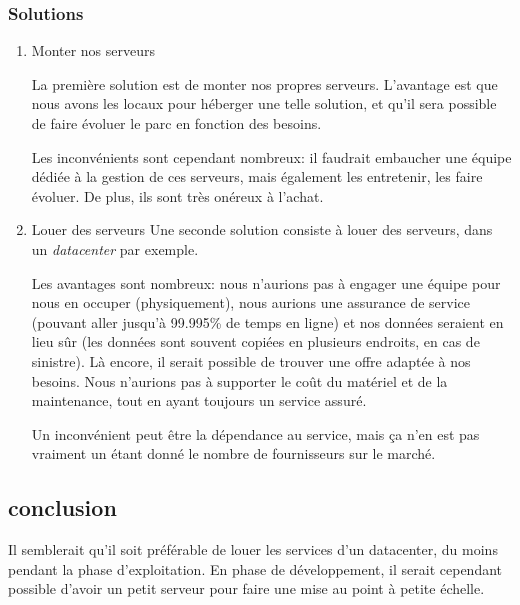     \subsubsection{Solutions}
        \begin{enumerate}
            \item Monter nos serveurs
            
            La première solution est de monter nos propres serveurs.
            L'avantage est que nous avons les locaux pour héberger une telle solution, et qu'il sera possible de faire évoluer le parc en fonction des besoins.
    
            Les inconvénients sont cependant nombreux: il faudrait embaucher une équipe dédiée à la gestion de ces serveurs, mais également les entretenir,
            les faire évoluer. De plus, ils sont très onéreux à l'achat.

            \item Louer des serveurs
            Une seconde solution consiste à louer des serveurs, dans un \textsl{datacenter} par exemple.

            Les avantages sont nombreux: nous n'aurions pas à engager une équipe pour
            nous en occuper (physiquement), nous aurions une assurance de service
            (pouvant aller jusqu'à 99.995\% de temps en ligne) et nos données seraient
            en lieu sûr (les données sont souvent copiées en plusieurs endroits, en cas de sinistre). Là encore, il serait possible de trouver une offre adaptée à nos besoins. Nous n'aurions pas à supporter le coût du matériel et de la maintenance, tout en ayant toujours un service assuré.

            Un inconvénient peut être la dépendance au service, mais ça n'en est pas vraiment un étant donné le nombre de fournisseurs sur le marché.
        \end{enumerate}
    \subsection{conclusion}
    Il semblerait qu'il soit préférable de louer les services d'un datacenter, du moins pendant la phase d'exploitation. En phase de développement,
il serait cependant possible d'avoir un petit serveur pour faire une mise au point à petite échelle.
%
\vfill
\pagebreak
